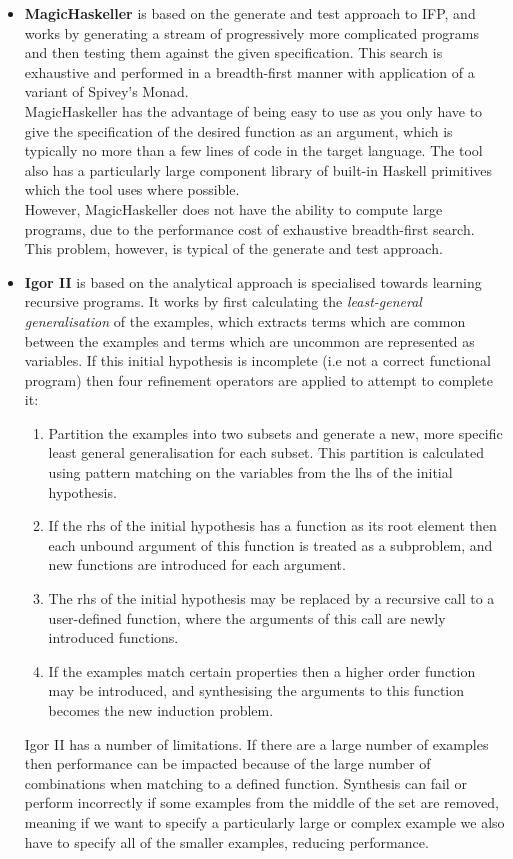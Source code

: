 \begin{itemize}
\item \textbf{MagicHaskeller} is based on the generate and test approach to IFP, and works by generating a stream of progressively more complicated programs and then testing them against the given specification. This search is exhaustive and performed in a breadth-first manner with application of a variant of Spivey's Monad.\\

MagicHaskeller has the advantage of being easy to use as you only have to give the specification of the desired function as an argument, which is typically no more than a few lines of code in the target language. The tool also has a particularly large component library of built-in Haskell primitives which the tool uses where possible.\\

However, MagicHaskeller does not have the ability to compute large programs, due to the performance cost of exhaustive breadth-first search. This problem, however, is typical of the generate and test approach.

\item \textbf{Igor II} is based on the analytical approach is specialised towards learning recursive programs. It works by first calculating the \textit{least-general generalisation} of the examples, which extracts terms which are common between the examples and terms which are uncommon are represented as variables. If this initial hypothesis is incomplete (i.e not a correct functional program) then four refinement operators are applied to attempt to complete it:
\begin{enumerate}
\item Partition the examples into two subsets and generate a new, more specific least general generalisation for each subset. This partition is calculated using pattern matching on the variables from the lhs of the initial hypothesis.
\item If the rhs of the initial hypothesis has a function as its root element then each unbound argument of this function is treated as a subproblem, and new functions are introduced for each argument.
\item The rhs of the initial hypothesis may be replaced by a recursive call to a user-defined function, where the arguments of this call are newly introduced functions.
\item If the examples match certain properties then a higher order function may be introduced, and synthesising the arguments to this function becomes the new induction problem.
\end{enumerate}
Igor II has a number of limitations. If there are a large number of examples then performance can be impacted because of the large number of combinations when matching to a defined function. Synthesis can fail or perform incorrectly if some examples from the middle of the set are removed, meaning if we want to specify a particularly large or complex example we also have to specify all of the smaller examples, reducing performance.
\end{itemize}

\nocite{*}

\renewcommand\bibname{{References}}



\pagebreak